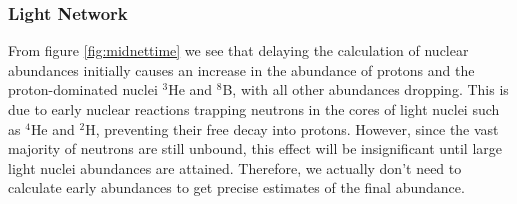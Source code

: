 \subsubsection{Light Network}

From figure \ref{fig:midnettime} we see that delaying the calculation of nuclear abundances initially causes an increase in the abundance of protons and the proton-dominated nuclei ${}^3$He and ${}^8$B, with all other abundances dropping. This is due to early nuclear reactions trapping neutrons in the cores of light nuclei such as ${}^4$He and ${}^2$H, preventing their free decay into protons. However, since the vast majority of neutrons are still unbound, this effect will be insignificant until large light nuclei abundances are attained. Therefore, we actually don't need to calculate early abundances to get precise estimates of the final abundance. 

